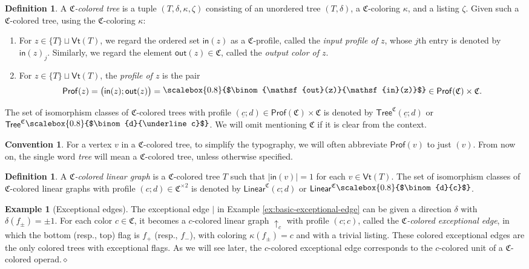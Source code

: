 \documentclass{amsbook}
\numberwithin{section}{chapter}
\numberwithin{subsection}{section}
\numberwithin{equation}{section}
\theoremstyle{plain}
\theoremstyle{definition}
\newtheorem{definition}[equation]{Definition}
\newtheorem{example}[equation]{Example}
\newtheorem{convention}[equation]{Convention}
\newcommand{\edge}{\vert}
\newcommand{\colorc}{\mathfrak{C}}
\newcommand{\Prof}{\mathsf{Prof}}
\newcommand{\Profc}{\Prof(\colorc)}
\newcommand{\Profcc}{\Profc \times \colorc}
\newcommand{\profofv}{\Prof(v)}
\newcommand{\profofz}{\Prof(z)}
\newcommand{\Vt}{\mathsf{Vt}}
\newcommand{\dqed}{\hfill$\diamond$}
\newcommand{\Linear}{\mathsf{Linear}}
\newcommand{\Linearc}{\Linear^{\colorc}}
\newcommand{\Tree}{\mathsf{Tree}}
\newcommand{\Treec}{\Tree^{\colorc}}
\newcommand{\uc}{\underline c}
\newcommand{\smallprof}[1]
{\raisebox{.05cm}{\scalebox{0.8}{#1}}}
\newcommand{\inout}[1]{\raisebox{.05cm}{\scalebox{0.8}{$\binom{\out(#1)}{\inp(#1)}$}}}
\newcommand{\dc}{\smallprof{$\binom{d}{c}$}}
\newcommand{\duc}{\smallprof{$\binom{d}{\uc}$}}
\newcommand{\inp}{\mathsf{in}}
\newcommand{\out}{\mathsf{out}}
\begin{document}
\begin{definition}\label{def:tree}
A \emph{$\colorc$-colored tree} is a tuple $(T,\delta,\kappa,\zeta)$ consisting of an unordered tree $(T,\delta)$, a $\colorc$-coloring $\kappa$, and a listing $\zeta$.  Given such a $\colorc$-colored tree, using the $\colorc$-coloring $\kappa$:
\begin{enumerate}
\item For $z \in \{T\} \sqcup \Vt(T)$, we regard the ordered set $\inp(z)$ as a $\colorc$-profile, called the \emph{input profile of $z$}, whose $j$th entry is denoted by $\inp(z)_j$.  Similarly, we regard the element $\out(z) \in \colorc$, called the \emph{output color of $z$}.
\item For $z \in \{T\} \sqcup \Vt(T)$, the \emph{profile of $z$} is the pair\label{notation:profz} \[\profofz = \bigl(\inp(z);\out(z)\bigr) = \inout{z} \in \Profcc.\]
\end{enumerate}
The set of isomorphism classes of $\colorc$-colored trees with profile $(\uc;d) \in \Profcc$ is denoted by\label{notation:treecduc} $\Treec(\uc;d)$ or $\Treec\duc$.  We will omit mentioning $\colorc$ if it is clear from the context.
\end{definition}

\begin{convention} For a vertex $v$ in a $\colorc$-colored tree, to simplify the typography, we will often abbreviate $\profofv$ to just $(v)$.  From now on, the single word \emph{tree} will mean a $\colorc$-colored tree, unless otherwise specified.
\end{convention}

\begin{definition}\label{def:linear-graph}
A \emph{$\colorc$-colored linear graph} is a $\colorc$-colored tree $T$ such that $|\inp(v)| = 1$ for each $v \in \Vt(T)$.  The set of isomorphism classes of $\colorc$-colored linear graphs with profile $(c;d) \in \colorc^{\times 2}$ is denoted by $\Linearc(c;d)$ or  $\Linearc\dc$.
\end{definition}

\begin{example}[Exceptional edges]\label{ex:colored-exedge} 
The exceptional edge $\edge$ in Example \ref{ex:basic-exceptional-edge} can be given a direction $\delta$ with $\delta(f_{\pm})=\pm 1$.  For each color $c \in \colorc$, it becomes a $c$-colored linear graph $\uparrow_c$ with profile $(c;c)$, called the \emph{$\colorc$-colored exceptional edge}, in which the bottom (resp., top) flag is $f_+$ (resp., $f_{-}$), with coloring $\kappa(f_{\pm}) = c$ and with a trivial listing.  These colored exceptional edges are the only colored trees with exceptional flags.  As we will see later, the $c$-colored exceptional edge corresponds to the $c$-colored unit of a $\colorc$-colored operad.\dqed
\end{example}
\end{document}
